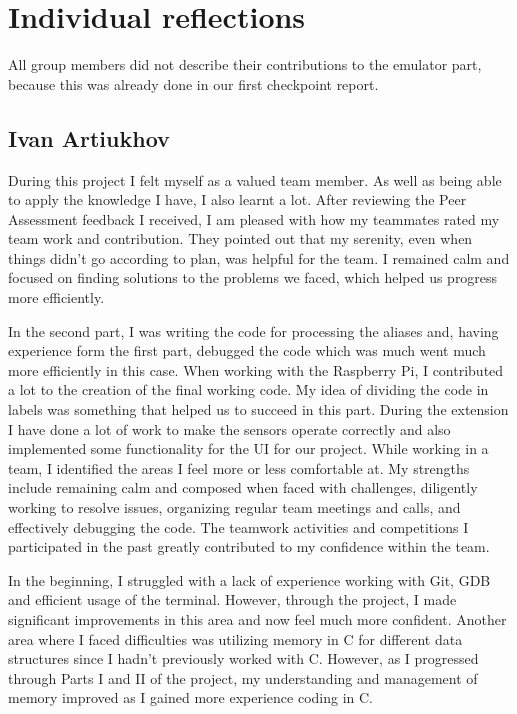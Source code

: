 \documentclass[11pt, oneside, UKenglish]{article}
\begin{document}
\section{Individual reflections}
All group members did not describe their contributions to the emulator part, because this was already done in our first checkpoint report.

\subsection{Ivan Artiukhov}
During this project I felt myself as a valued team member.
As well as being able to apply the knowledge I have, I also learnt a lot.
After reviewing the Peer Assessment feedback I received, I am pleased with how my teammates rated my team work and contribution.
They pointed out that my serenity, even when things didn't go according to plan, was helpful for the team.
I remained calm and focused on finding solutions to the problems we faced, which helped us progress more efficiently.

In the second part, I was writing the code for processing the aliases and, having experience form the first part, debugged the code which was much went much more efficiently in this case.
When working with the Raspberry Pi, I contributed a lot to the creation of the final working code.
My idea of dividing the code in labels was something that helped us to succeed in this part.
During the extension I have done a lot of work to make the sensors operate correctly and also implemented some functionality for the UI for our project. 
While working in a team, I identified the areas I feel more or less comfortable at.
My strengths include remaining calm and composed when faced with challenges, diligently working to resolve issues, organizing regular team meetings and calls, and effectively debugging the code.
The teamwork activities and competitions I participated in the past greatly contributed to my confidence within the team. 

In the beginning, I struggled with a lack of experience working with Git, GDB and efficient usage of the terminal.
However, through the project, I made significant improvements in this area and now feel much more confident.
Another area where I faced difficulties was utilizing memory in C for different data structures since I hadn't previously worked with C.
However, as I progressed through Parts I and II of the project, my understanding and management of memory improved as I gained more experience coding in C.
\end{document}
